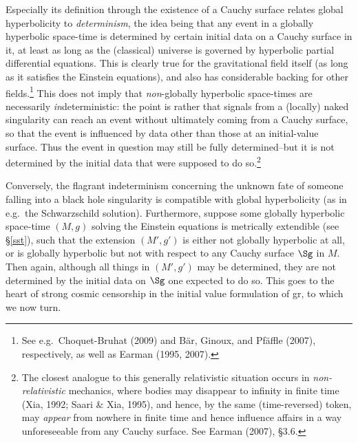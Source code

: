 \documentclass[11pt,a4paper]{article}
\newcommand{\GR}{{\sc gr}}
\begin{document}
Especially its definition through the existence of a Cauchy surface relates global hyperbolicity to \emph{determinism}, the idea being that any event in a globally hyperbolic space-time is determined by certain initial data on a Cauchy surface in it, at least as long as the (classical) universe is governed by hyperbolic partial differential equations. This is clearly true for the gravitational field itself (as long as it satisfies the Einstein equations), and also has considerable backing for other fields.\footnote{See e.g.\  Choquet-Bruhat (2009) and B\"{a}r, Ginoux, and Pf\"{a}ffle (2007), respectively, as well as Earman (1995, 2007).}
This does not imply that \emph{non}-globally hyperbolic space-times are necessarily \emph{in}deterministic:  the point is rather that signals from a (locally) naked singularity can reach an event without ultimately coming from a 
Cauchy surface, so that the event is influenced by data other than those at an initial-value surface. Thus the event in question may still be fully determined--but it is not determined by the initial data that were supposed to do so.\footnote{
The closest analogue to this generally relativistic situation occurs in \emph{non-relativistic} mechanics, where bodies may disappear to infinity in finite time (Xia, 1992; Saari \& Xia, 1995), and hence, by the same (time-reversed) token, may \emph{appear} from nowhere in finite time and hence influence affairs in a way unforeseeable from any Cauchy surface.
See Earman (2007), \S 3.6.}

Conversely,  the flagrant indeterminism concerning the unknown fate of someone falling into a black hole singularity is compatible with global hyperbolicity (as in e.g.\ the Schwarzschild solution). Furthermore, suppose some globally hyperbolic space-time $(M,g)$ solving the Einstein equations is metrically extendible (see \S\ref{sst}), such that the extension $(M',g')$  is either not globally hyperbolic at all, or is  globally hyperbolic but not with respect to any Cauchy surface $\Sg$ in $M$. Then again, although all things in $(M',g')$ may be determined, they are not determined by the initial data on $\Sg$ one expected to do so. This goes to the heart of strong cosmic censorship in the initial value formulation of \GR, to which we now turn. 
\end{document}
